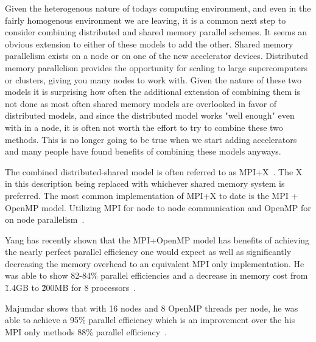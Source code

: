 %
Given the heterogenous nature of todays computing environment, and even in the fairly homogenous environment we are leaving, it is a common next step to consider combining distributed and shared memory parallel schemes.
%
It seems an obvious extension to either of these models to add the other.
%
Shared memory parallelism exists on a node or on one of the new accelerator devices.
%
Distributed memory parallelism provides the opportunity for scaling to large supercomputers or clusters, giving you many nodes to work with.
%
Given the nature of these two models it is surprising how often the additional extension of combining them is not done as most often shared memory models are overlooked in favor of distributed models, and since the distributed model works "well enough" even with in a node, it is often not worth the effort to try to combine these two methods.
%
This is no longer going to be true when we start adding accelerators and many people have found benefits of combining these models anyways.
%

%
The combined distributed-shared model is often referred to as MPI+X~\cite{michaelwolfe2014}.
%
The X in this description being replaced with whichever shared memory system is preferred.
%
The most common implementation of MPI+X to date is the MPI + OpenMP model.
%
Utilizing MPI for node to node communication and OpenMP for on node parallelism~\cite{michaelwolfe2014}.
%

%
Yang has recently shown that the MPI+OpenMP model has benefits of achieving the nearly perfect parallel efficiency one would expect as well as significantly decreasing the memory overhead to an equivalent MPI only implementation.
%
He was able to show 82-84\% parallel efficiencies and a decrease in memory cost from \~1.4GB to \~200MB for 8 processors~\cite{yanghybrid}.
%

%
Majumdar shows that with 16 nodes and 8 OpenMP threads per node, he was able to achieve a 95\% parallel efficiency which is an improvement over the his MPI only methods 88\% parallel efficiency~\cite{majumdar2000parallel}. 
%

%

%
